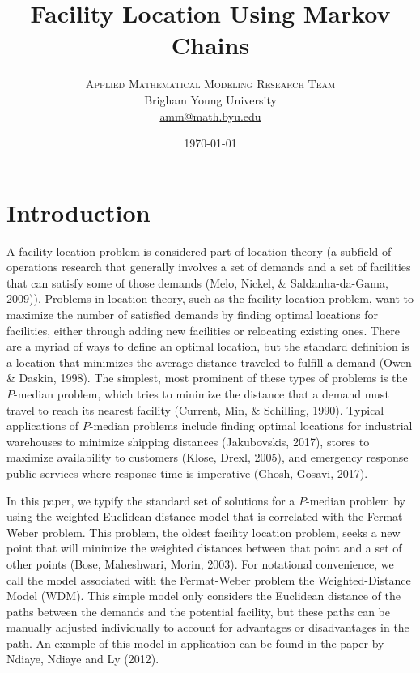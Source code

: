 \documentclass[twoside,twocolumn]{article}
\title{Facility Location Using Markov Chains}
\author{
\textsc{Applied Mathematical Modeling Research Team}\\[1ex]
\normalsize Brigham Young University \\
\normalsize \href{mailto:amm@math.byu.edu}{amm@math.byu.edu}
}
\date{\today}
\begin{document}
\maketitle

\section{Introduction}

A facility location problem is considered part of location theory (a subfield of operations research that generally involves a set of demands and a set of facilities that can satisfy some of those demands (Melo, Nickel, \& Saldanha-da-Gama, 2009)).
Problems in location theory, such as the facility location problem, want to maximize the number of satisfied demands by finding optimal locations for facilities, either through adding new facilities or relocating existing ones.
There are a myriad of ways to define an optimal location, but the standard definition is a location that minimizes the average distance traveled to fulfill a demand (Owen \& Daskin, 1998).
The simplest, most prominent of these types of problems is the $P$-median problem, which tries to minimize the distance that a demand must travel to reach its nearest facility (Current, Min, \& Schilling, 1990). %
Typical applications of $P$-median problems include finding optimal locations for industrial warehouses to minimize shipping distances (Jakubovskis, 2017), stores to maximize availability to customers (Klose, Drexl, 2005), and emergency response public services where response time is imperative (Ghosh, Gosavi, 2017).

In this paper, we typify the standard set of solutions for a $P$-median problem by using the weighted Euclidean distance model that is correlated with the Fermat-Weber problem. %
This problem, the oldest facility location problem, seeks a new point that will minimize the weighted distances between that point and a set of other points (Bose, Maheshwari, Morin, 2003).
For notational convenience, we call the model associated with the Fermat-Weber problem the Weighted-Distance Model (WDM). %
This simple model only considers the Euclidean distance of the paths between the demands and the potential facility, but these paths can be manually adjusted individually to account for advantages or disadvantages in the path. %
An example of this model in application can be found in the paper by Ndiaye, Ndiaye and Ly (2012). %
\end{document}
